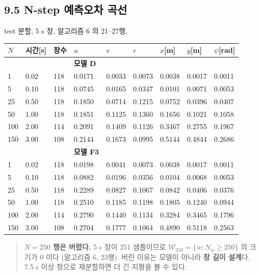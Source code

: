 \documentclass[10pt,a4paper]{article}
\begin{document}
\subsection*{9.5 N-step 예측오차 곡선}

test 분할, 5 s 창, 알고리즘 6 의 21--27행.

\begin{center}\scriptsize\setlength{\tabcolsep}{3pt}
\begin{tabular}{@{}lllllllll@{}}
\toprule
\textbf{$N$} & \textbf{시간[s]} & \textbf{창수} & \textbf{$u$} & \textbf{$v$} & \textbf{$r$} & \textbf{$x$[m]} & \textbf{$y$[m]} & \textbf{$\psi$[rad]} \\
\midrule
 &  &  & \textbf{모델 D} &  &  &  &  &  \\
1 & 0.02 & 118 & 0.0171 & 0.0033 & 0.0073 & 0.0038 & 0.0017 & 0.0011 \\
5 & 0.10 & 118 & 0.0745 & 0.0165 & 0.0347 & 0.0101 & 0.0071 & 0.0053 \\
25 & 0.50 & 118 & 0.1850 & 0.0714 & 0.1215 & 0.0752 & 0.0396 & 0.0407 \\
50 & 1.00 & 118 & 0.1851 & 0.1125 & 0.1360 & 0.1656 & 0.1021 & 0.1058 \\
100 & 2.00 & 114 & 0.2091 & 0.1409 & 0.1126 & 0.3467 & 0.2755 & 0.1967 \\
150 & 3.00 & 108 & 0.2144 & 0.1673 & 0.0995 & 0.5144 & 0.4844 & 0.2686 \\
 &  &  & \textbf{모델 F3} &  &  &  &  &  \\
1 & 0.02 & 118 & 0.0198 & 0.0041 & 0.0073 & 0.0038 & 0.0017 & 0.0011 \\
5 & 0.10 & 118 & 0.0882 & 0.0196 & 0.0356 & 0.0104 & 0.0068 & 0.0053 \\
25 & 0.50 & 118 & 0.2289 & 0.0827 & 0.1067 & 0.0842 & 0.0406 & 0.0376 \\
50 & 1.00 & 118 & 0.2510 & 0.1185 & 0.1198 & 0.1805 & 0.1240 & 0.0944 \\
100 & 2.00 & 114 & 0.2790 & 0.1440 & 0.1134 & 0.3284 & 0.3465 & 0.1796 \\
150 & 3.00 & 108 & 0.2704 & 0.1777 & 0.1064 & 0.4890 & 0.5118 & 0.2563 \\
\bottomrule
\end{tabular}
\end{center}

\begin{quote}\small
\textbf{$N = 250$ 행은 버렸다.} 5 s 창이 251 샘플이므로 $\mathcal{W}_{250} = \{w : N_w \ge 250\}$ 의 크기가 0 이다 (알고리즘 6, 23행). 버린 이유는 모델이 아니라 \textbf{창 길이 설계}다. 7.5 s 이상 창으로 재분할하면 더 긴 지평을 볼 수 있다.
\end{quote}
\end{document}
